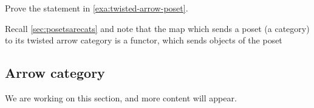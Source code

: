 \begin{exercise}
Prove the statement in \cref{exa:twisted-arrow-poset}.
\end{exercise}
\begin{solution}
\end{solution}
\begin{remark}
  Recall \cref{sec:posetsarecats} and note that the map which sends a poset (a category) to its twisted arrow category is a functor, which sends objects of the poset
\end{remark}

\subsection{Arrow category}

We are working on this section, and more content will appear.


